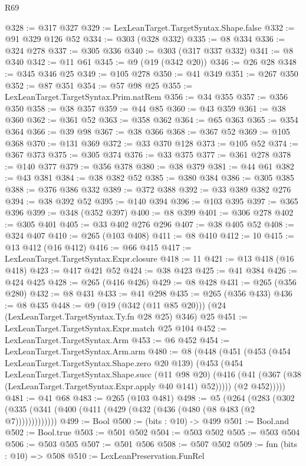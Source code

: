 \begin{lexlean}{R69}
\begin{coremodule}
@328 := @317 @327
@329 := LexLeanTarget.TargetSyntax.Shape.false
@332 := @91 @329 @126 @52
@334 := @303 (@328 @332)
@335 := @8 @334
@336 := @324 @278
@337 := @305 @336
@340 := @303 (@317 @337 @332)
@341 := @8 @340
@342 := @11 @61
@345 := @9 (@19 (@342 @20))
@346 := @26 @28
@348 := @345 @346 @25
@349 := @105 @278
@350 := @41 @349
@351 := @267 @350
@352 := @87 @351
@354 := @57 @98 @25
@355 := LexLeanTarget.TargetSyntax.Prim.natRem
@356 := @34 @355
@357 := @356 @350
@358 := @38 @357
@359 := @44 @85
@360 := @43 @359
@361 := @38 @360
@362 := @361 @52
@363 := @358 @362
@364 := @65 @363
@365 := @354 @364
@366 := @39 @98
@367 := @38 @366
@368 := @367 @52
@369 := @105 @368
@370 := @131 @369
@372 := @33 @370 @128
@373 := @105 @52
@374 := @367 @373
@375 := @305 @374
@376 := @33 @375
@377 := @361 @278
@378 := @140 @377
@379 := @356 @378
@380 := @38 @379
@381 := @44 @61
@382 := @43 @381
@384 := @38 @382 @52
@385 := @380 @384
@386 := @305 @385
@388 := @376 @386 @332
@389 := @372 @388
@392 := @33 @389 @382 @276
@394 := @38 @392 @52
@395 := @140 @394
@396 := @103 @395
@397 := @365 @396
@399 := @348 (@352 @397)
@400 := @8 @399
@401 := @306 @278
@402 := @305 @401
@405 := @33 @402 @276 @296
@407 := @38 @405 @52
@408 := @324 @407
@410 := @265 (@103 @408)
@411 := @8 @410
@412 := 10
@415 := @13 @412 (@16 @412)
@416 := @66 @415
@417 := LexLeanTarget.TargetSyntax.Expr.closure
@418 := 11
@421 := @13 @418 (@16 @418)
@423 := @417 @421 @52
@424 := @38 @423
@425 := @41 @384
@426 := @424 @425
@428 := @265 (@416 @426)
@429 := @8 @428
@431 := @265 (@356 @280)
@432 := @8 @431
@433 := @41 @298
@435 := @265 (@356 @433)
@436 := @8 @435
@448 := @9 (@19 (@342 (@11 @85 @20))) (@24 (LexLeanTarget.TargetSyntax.Ty.fn @28 @25) @346) @25
@451 := LexLeanTarget.TargetSyntax.Expr.match @25 @104
@452 := LexLeanTarget.TargetSyntax.Arm
@453 := @6 @452
@454 := LexLeanTarget.TargetSyntax.Arm.arm
@480 := @8
    (@448
      (@451
        (@453
          (@454 LexLeanTarget.TargetSyntax.Shape.zero @20 @139)
          (@453
            (@454
              LexLeanTarget.TargetSyntax.Shape.succ
              (@11 @98 @20)
              (@416 (@41 (@367 (@38 (LexLeanTarget.TargetSyntax.Expr.apply @40 @141) @52)))))
            (@2 @452)))))
@481 := @41 @68
@483 := @265 (@103 @481)
@498 := @5
    (@264 (@283 (@302 (@335 (@341 (@400 (@411 (@429 (@432 (@436 (@480 (@8 @483 (@2 @7)))))))))))))
@499 := Bool
@500 := (bits : @10) -> @499
@501 := Bool.and
@502 := Bool.true
@503 := @501 @502
@504 := @503 @502
@505 := @503 @504
@506 := @503 @505
@507 := @501 @506
@508 := @507 @502
@509 := fun (bits : @10) => @508
@510 := LexLeanPreservation.FunRel

\end{coremodule}
\end{lexlean}
